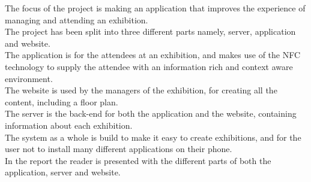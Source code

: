 The focus of the project is making an application that improves the experience of managing and attending an exhibition.\\
The project has been split into three different parts namely, server, application and website.\\
The application is for the attendees at an exhibition, and makes use of the NFC technology to supply the attendee with an information rich and context aware environment.\\
The website is used by the managers of the exhibition, for creating all the content, including a floor plan.\\
The server is the back-end for both the application and the website, containing information about each exhibition.\\
The system as a whole is build to make it easy to create exhibitions, and for the user not to install many different applications on their phone.\\
In the report the reader is presented with the different parts of both the application, server and website.